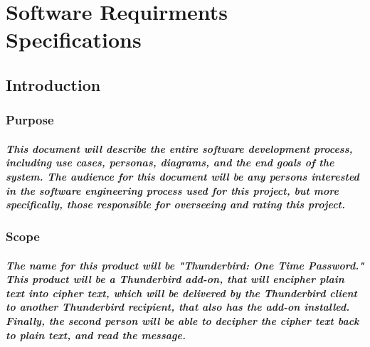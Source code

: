 
\chapter{Software Requirments Specifications}
\section{Introduction}

\subsection{Purpose}
\paragraph{This document will describe the entire software development process, including use cases, personas, diagrams, and the end goals of the system. The audience for this document will be any persons interested in the software engineering process used for this project, but more specifically, those responsible for overseeing and rating this project.}



\subsection{Scope}
\paragraph{The name for this product will be "Thunderbird: One Time Password." This product will be a Thunderbird add-on, that will encipher plain text into cipher text, which will be delivered by the Thunderbird client to another Thunderbird recipient, that also has the add-on installed. Finally, the second person will be able to decipher the cipher text back to plain text, and read the message.}

